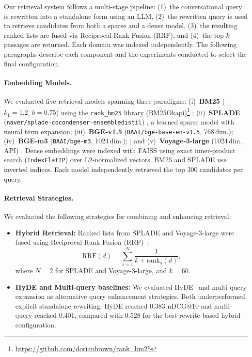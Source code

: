 \documentclass[11pt]{article}
\begin{document}
Our retrieval system follows a multi-stage pipeline: (1)~the conversational query is rewritten into a standalone form using an LLM, (2)~the rewritten query is used to retrieve candidates from both a sparse and a dense model, (3)~the resulting ranked lists are fused via Reciprocal Rank Fusion (RRF), and (4)~the top-$k$ passages are returned. Each domain was indexed independently. The following paragraphs describe each component and the experiments conducted to select the final configuration. 


\paragraph{Embedding Models.}
We evaluated five retrieval models spanning three paradigms: (i)~\textbf{BM25} ($k_1{=}1.2$, $b{=}0.75$) using the \texttt{rank\_bm25} library (BM25Okapi)\footnote{\url{https://github.com/dorianbrown/rank_bm25}} \cite{10.1561/1500000019}; (ii)~\textbf{SPLADE} (\texttt{naver/splade-cocondenser-ensembledistil}) \cite{formal2021spladesparselexicalexpansion}, a learned sparse model with neural term expansion; (iii)~\textbf{BGE-v1.5} (\texttt{BAAI/bge-base-en-v1.5}, 768\,dim.); (iv)~\textbf{BGE-m3} (\texttt{BAAI/bge-m3}, 1024\,dim.); \cite{chen-etal-2024-m3}; and (v)~\textbf{Voyage-3-large} (1024\,dim., API) \cite{voyageai2025_voyage3large}. Dense embeddings were indexed with FAISS \cite{8733051} using exact inner-product search (\texttt{IndexFlatIP}) over L2-normalized vectors. BM25 and SPLADE use inverted indices. Each model independently retrieved the top 300 candidates per query.

\paragraph{Retrieval Strategies.}
We evaluated the following strategies for combining and enhancing retrieval:


\begin{itemize}
    \item \textbf{Hybrid Retrieval:} Ranked lists from SPLADE and Voyage-3-large were fused using Reciprocal Rank Fusion (RRF)~\cite{10.1145/1571941.1572114}:
    \begin{equation}
      \mathrm{RRF}(d) = \sum_{s=1}^{N} \frac{1}{k + \mathrm{rank}_{s}(d)},
      \label{eq:rrf}
    \end{equation}
    where $N=2$ for SPLADE and Voyage-3-large, and $k=60$.

    \item \textbf{HyDE and Multi-query baselines:} We evaluated HyDE~\cite{gao-etal-2023-precise} and multi-query expansion as alternative query enhancement strategies. Both underperformed explicit standalone rewriting: HyDE reached 0.383 nDCG@10 and multi-query reached 0.401, compared with 0.528 for the best rewrite-based hybrid configuration.
\end{itemize}
\end{document}
